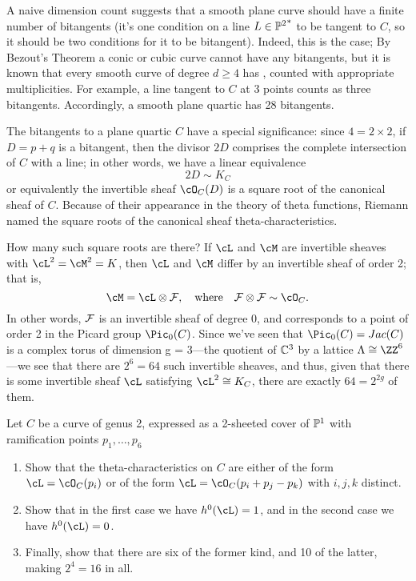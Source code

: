 A naive dimension count suggests that a smooth plane curve should have a finite number of bitangents (it's one condition on a line $L \in {\PP^2}^*$ to be tangent to $C$, so it should be two conditions for it to be bitangent). Indeed, this is the case; By Bezout's Theorem a conic or cubic curve cannot have any bitangents, but it is known that every smooth curve of degree $d \geq 4$ has , counted with appropriate multiplicities. For example, a line tangent to $C$ at 3 points  counts as three bitangents. Accordingly, a smooth plane quartic has 28 bitangents.

The bitangents to a plane quartic $C$ have a special significance: since $4 = 2 \times 2$, if $D = p+q$ is a bitangent, then the divisor $2D$ comprises the complete intersection of $C$ with a line; in other words, we have a linear equivalence
$$
2D \sim K_C
$$
or equivalently the invertible sheaf $\cO_C(D)$ is a square root of the canonical sheaf of $C$. Because of their appearance in the theory of theta functions, Riemann named the square roots of the canonical sheaf theta-characteristics.

How many such square roots are there? If $\cL$ and $\cM$ are invertible sheaves with $\cL^2 = \cM^2 = K$, then $\cL$ and $\cM$ differ by an invertible sheaf of order 2; that is,
$$
\cM = \cL \otimes \cF, \quad \text{where} \quad \cF \otimes \cF \sim \cO_C.
$$
In other words, $\cF$ is an invertible sheaf of degree 0, and  corresponds to a point of order 2 in the Picard group $\Pic_0(C)$. Since we've seen that $\Pic_0(C) = Jac(C)$ is a complex torus of dimension g = 3---the quotient of $\CC^3$ by a lattice $\Lambda \cong \ZZ^6$---we see that there are $2^6 = 64$ such invertible sheaves, and thus, given that there is some invertible sheaf $\cL$ satisfying $\cL^2 \cong K_C$, there are exactly $64 = 2^{2g}$ of them.

 \begin{exercise}
 Let $C$ be a curve of genus 2, expressed as a 2-sheeted cover of $\PP^1$ with ramification points $p_1,\dots,p_6$
 \begin{enumerate}
 \item Show that the theta-characteristics on $C$ are either of the form $\cL = \cO_C(p_i)$ or of the form $\cL = \cO_C(p_i + p_j - p_k)$ with $i, j, k$ distinct. 
 \item Show that in the first case we have $h^0(\cL) = 1$, and in the second case we have $h^0(\cL) = 0$. 
 \item Finally, show that there are six of the former kind, and 10 of the latter, making $2^4 = 16$ in all.
 \end{enumerate}
 \end{exercise}
 
